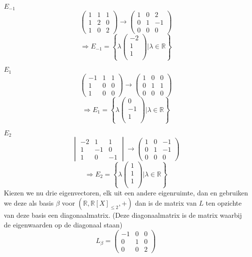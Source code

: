 \documentclass[lineaire_algebra_oplossingen.tex]{subfiles}
\begin{document}
\emph{$E_{-1}$}\\
\[
\begin{pmatrix}
1 & 1 & 1\\
1 & 2 & 0\\
1 & 0 & 2
\end{pmatrix}
\rightarrow
\begin{pmatrix}
1 & 0 & 2\\
0 & 1 & -1\\
0 & 0 & 0
\end{pmatrix}
\]
\[
\Rightarrow E_{-1} = 
\left\{ 
\lambda
\begin{pmatrix}
-2\\1\\1\\
\end{pmatrix}
| \lambda \in \mathbb{R}
\right\}
\]

\emph{$E_1$}\\
\[
\begin{pmatrix}
-1 & 1 & 1\\
1 & 0 & 0\\
1 & 0 & 0
\end{pmatrix}
\rightarrow
\begin{pmatrix}
1 & 0 & 0\\
0 & 1 & 1\\
0 & 0 & 0
\end{pmatrix}
\]
\[
\Rightarrow E_1 = 
\left\{ 
\lambda
\begin{pmatrix}
0\\-1\\1\\
\end{pmatrix}
| \lambda \in \mathbb{R}
\right\}
\]

\emph{$E_2$}\\
\[
\begin{vmatrix}
-2 & 1 & 1\\
1 & -1& 0\\
1 & 0 & -1
\end{vmatrix}
\rightarrow
\begin{pmatrix}
1 & 0 & -1\\
0 & 1 & -1\\
0 & 0 & 0
\end{pmatrix}
\]
\[
\Rightarrow E_2 = 
\left\{ 
\lambda
\begin{pmatrix}
1\\1\\1\\
\end{pmatrix}
| \lambda \in \mathbb{R}
\right\}
\]
Kiezen we nu drie eigenvectoren, elk uit een andere eigenruimte, dan en gebruiken we deze als basis $\beta$ voor $(\mathbb{R},\mathbb{R}[X]_{\le 2},+)$ dan is de matrix van $L$ ten opzichte van deze basis een diagonaalmatrix.
(Deze diagonaalmatrix is de matrix waarbij de eigenwaarden op de diagonaal staan)
\[
L_\beta = 
\begin{pmatrix}
-1 & 0 & 0\\
 0 & 1 & 0\\
 0 & 0 & 2
\end{pmatrix}
\]
\end{document}
